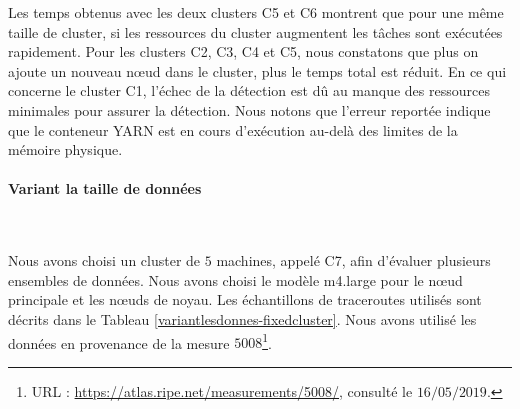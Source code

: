 


Les temps obtenus avec les deux clusters C5 et C6 montrent que pour une même taille de cluster,  si les ressources du cluster augmentent  les tâches sont exécutées rapidement. 
Pour les clusters C2, C3, C4 et C5, nous constatons que plus on ajoute un nouveau n\oe{}ud dans  le cluster, plus le temps total est réduit. En ce qui concerne le cluster C1, l'échec de la détection est dû au manque des ressources minimales pour assurer la détection. Nous notons que l'erreur reportée  indique que le conteneur YARN est en cours d'exécution au-delà des limites de la mémoire physique.


\paragraph{Variant la taille de données}~


Nous avons choisi un cluster de $ 5 $ machines, appelé C7, afin d'évaluer plusieurs ensembles de données. Nous avons choisi le modèle m4.large pour le n\oe{}ud principale et les n\oe{}uds de noyau. Les échantillons de traceroutes utilisés sont décrits dans le Tableau \ref{variantlesdonnes-fixedcluster}. Nous avons utilisé les données en provenance de la mesure $ 5008 $\footnote{URL : \url{https://atlas.ripe.net/measurements/5008/}, consulté le $16/05/2019$.}.


\begin{table}[H]
	\centering
\caption{Les traceroutes utilisés dans le cluster C7}
\label{variantlesdonnes-fixedcluster}
\end{table}


